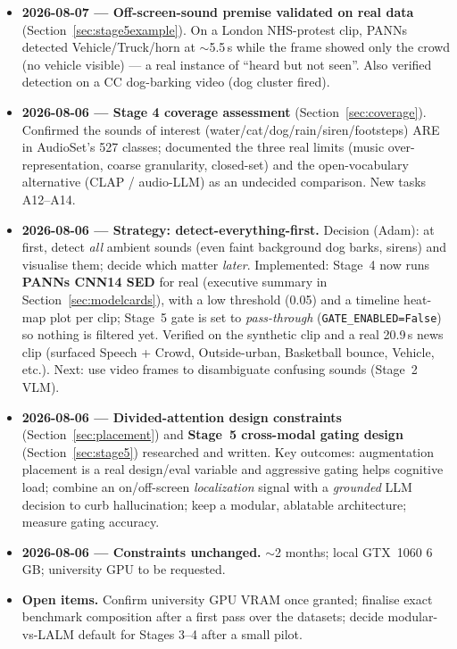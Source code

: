 \documentclass[11pt,a4paper]{article}
\begin{document}
\begin{itemize}
    On a real CC red-alert (Tzeva Adom) recording, PANNs detected explosions/impacts well but scored
    the alert siren at only 0.025 --- a concrete closed-set/training-distribution limitation that
    strengthens the case for an open-vocabulary (CLAP / audio-LLM) path for safety-critical alerts.
  \item \textbf{2026-08-07 --- Off-screen-sound premise validated on real data}
    (Section~\ref{sec:stage5example}). On a London NHS-protest clip, PANNs detected Vehicle/Truck/horn
    at $\sim$5.5\,s while the frame showed only the crowd (no vehicle visible) --- a real instance of
    ``heard but not seen''. Also verified detection on a CC dog-barking video (dog cluster fired).
  \item \textbf{2026-08-06 --- Stage 4 coverage assessment} (Section~\ref{sec:coverage}). Confirmed
    the sounds of interest (water/cat/dog/rain/siren/footsteps) ARE in AudioSet's 527 classes;
    documented the three real limits (music over-representation, coarse granularity, closed-set) and
    the open-vocabulary alternative (CLAP / audio-LLM) as an undecided comparison. New tasks
    A12--A14.
  \item \textbf{2026-08-06 --- Strategy: detect-everything-first.} Decision (Adam): at first,
    detect \emph{all} ambient sounds (even faint background dog barks, sirens) and visualise them;
    decide which matter \emph{later}. Implemented: Stage~4 now runs \textbf{PANNs CNN14 SED} for real
    (executive summary in Section~\ref{sec:modelcards}), with a low threshold (0.05) and a timeline
    heat-map plot per clip; Stage~5 gate is set to \emph{pass-through} (\texttt{GATE\_ENABLED=False})
    so nothing is filtered yet. Verified on the synthetic clip and a real 20.9\,s news clip
    (surfaced Speech + Crowd, Outside-urban, Basketball bounce, Vehicle, etc.). Next: use video
    frames to disambiguate confusing sounds (Stage~2 VLM).
  \item \textbf{2026-08-06 --- Divided-attention design constraints} (Section~\ref{sec:placement})
    and \textbf{Stage~5 cross-modal gating design} (Section~\ref{sec:stage5}) researched and written.
    Key outcomes: augmentation placement is a real design/eval variable and aggressive gating helps
    cognitive load; combine an on/off-screen \emph{localization} signal with a \emph{grounded} LLM
    decision to curb hallucination; keep a modular, ablatable architecture; measure gating accuracy.
  \item \textbf{2026-08-06 --- Constraints unchanged.} $\sim$2 months; local GTX~1060 6\,GB;
    university GPU to be requested.
  \item \textbf{Open items.} Confirm university GPU VRAM once granted; finalise exact benchmark
    composition after a first pass over the datasets; decide modular-vs-LALM default for Stages 3--4
    after a small pilot.
\end{itemize}
\end{document}
